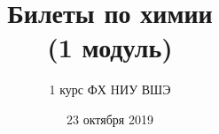 \documentclass[11pt]{article}
\title{\textbf{Билеты по химии}\\ {\normalsize (1 модуль)}}
\author{1 курс ФХ HИУ ВШЭ}
\date{23 октября 2019}
\begin{document}
\begin{titlepage}
\maketitle
\end{titlepage}
\tableofcontents
\end{document}
